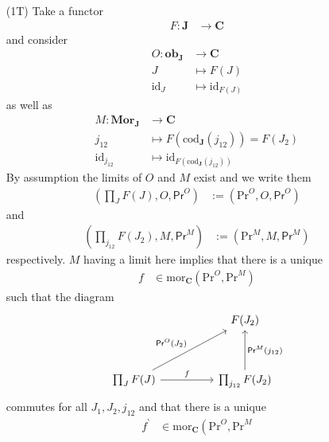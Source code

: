 \begin{prf}
\begin{enumerate}
\item[(1T)]
Take a functor
\begin{align*}
  F
  \colon
  \mathbf{J}
  &\rightarrow
  \mathbf{C}
\end{align*}
and consider
\begin{align*}
  O
  \colon
  \mathbf{ob}_{\mathbf{J}}
  &\rightarrow
  \mathbf{C}
  \\
  J
  &\mapsto
  F(J)
  \\
  \mathrm{id}_{J}
  &\mapsto
  \mathrm{id}_{F(J)}
\end{align*}
as well as
\begin{align*}
  M
  \colon
  \mathbf{Mor}_{\mathbf{J}}
  &\rightarrow
  \mathbf{C}
  \\
  j_{12}
  &\mapsto
  F(\mathrm{cod}_{\mathbf{J}}(j_{12}))
  =
  F(J_{2})
  \\
  \mathrm{id}_{j_{12}}
  &\mapsto
  \mathrm{id}_{F(\mathrm{cod}_{\mathbf{J}}(j_{12}))}
\end{align*}
By assumption the limits of $O$ and $M$ exist and we write them
\begin{align*}
  \left(
    \prod_{J}F(J),
    O,
    \mathsf{Pr}^{O}
  \right)
  &:=
  \left(
    \mathrm{Pr}^{O},
    O,
    \mathsf{Pr}^{O}
  \right)
\end{align*}
and
\begin{align*}
  \left(
    \prod_{j_{12}}F(J_{2}),
    M,
    \mathsf{Pr}^{M}
  \right)
  &:=
  \left(
    \mathrm{Pr}^{M},
    M,
    \mathsf{Pr}^{M}
  \right)
\end{align*}
respectively. $M$ having a limit here implies that there is a unique
\begin{align*}
  f
  &\in
  \mathrm{mor}_{\mathbf{C}}
  \left(
    \mathrm{Pr}^{O},
    \mathrm{Pr}^{M}
  \right)
\end{align*}
such that the diagram
\[
\begin{tikzcd}[sep=normal]
  &
  &
  F(J_{2})
  \\
  &&
  \\
  \prod_{J}F(J)
  \arrow{uurr}{\mathsf{Pr}^{O}(J_{2})}
  \arrow{rr}{f}
  &
  &
  \prod_{j_{12}}F(J_{2})
  \arrow[swap]{uu}{\mathsf{Pr}^{M}(j_{12})}
\end{tikzcd}
\]
commutes for all $J_{1},J_{2},j_{12}$ and that there is a unique
\begin{align*}
  f^{\backprime}
  &\in
  \mathrm{mor}_{\mathbf{C}}
  \left(
    \mathrm{Pr}^{O},
    \mathrm{Pr}^{M}

\end{align*}
\end{enumerate}
\end{prf}
